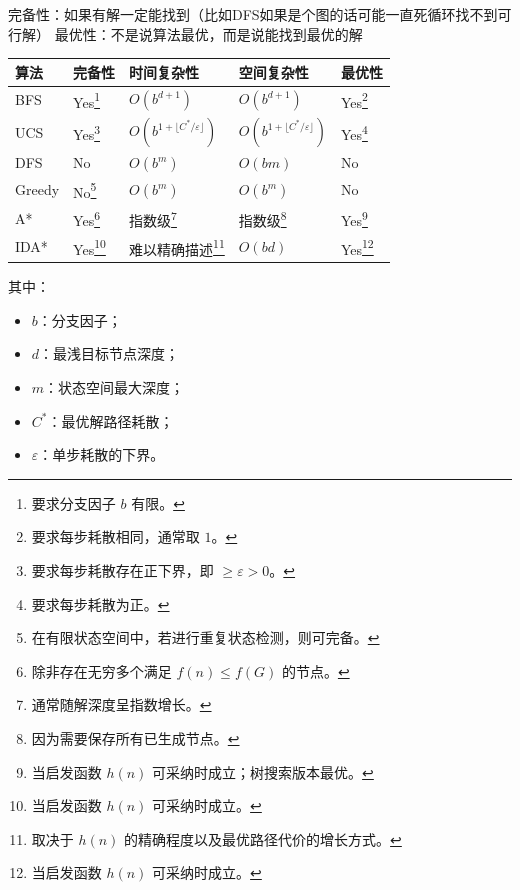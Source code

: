 \documentclass[../main.tex]{subfiles}
\begin{document}
完备性：如果有解一定能找到（比如DFS如果是个图的话可能一直死循环找不到可行解）
最优性：不是说算法最优，而是说能找到最优的解
\begin{center}
\renewcommand{\arraystretch}{1.2}
\begin{tabularx}{\textwidth}{>{\raggedright\arraybackslash}p{2.8cm}
>{\raggedright\arraybackslash}X
>{\raggedright\arraybackslash}X
>{\raggedright\arraybackslash}X
>{\raggedright\arraybackslash}X}
\toprule
算法 & 完备性 & 时间复杂性 & 空间复杂性 & 最优性 \\
\midrule
BFS
& Yes\footnote{要求分支因子 $b$ 有限。}
& $O(b^{d+1})$
& $O(b^{d+1})$
& Yes\footnote{要求每步耗散相同，通常取 $1$。} \\

UCS
& Yes\footnote{要求每步耗散存在正下界，即 $\ge \varepsilon > 0$。}
& $O\!\left(b^{1+\lfloor C^*/\varepsilon \rfloor}\right)$
& $O\!\left(b^{1+\lfloor C^*/\varepsilon \rfloor}\right)$
& Yes\footnote{要求每步耗散为正。} \\

DFS
& No
& $O(b^m)$
& $O(bm)$
& No \\

Greedy
& No\footnote{在有限状态空间中，若进行重复状态检测，则可完备。}
& $O(b^m)$
& $O(b^m)$
& No \\

A*
& Yes\footnote{除非存在无穷多个满足 $f(n)\le f(G)$ 的节点。}
& 指数级\footnote{通常随解深度呈指数增长。}
& 指数级\footnote{因为需要保存所有已生成节点。}
& Yes\footnote{当启发函数 $h(n)$ 可采纳时成立；树搜索版本最优。} \\

IDA*
& Yes\footnote{当启发函数 $h(n)$ 可采纳时成立。}
& 难以精确描述\footnote{取决于 $h(n)$ 的精确程度以及最优路径代价的增长方式。}
& $O(bd)$
& Yes\footnote{当启发函数 $h(n)$ 可采纳时成立。} \\
\bottomrule
\end{tabularx}
\end{center}

其中：
\begin{itemize}
    \item $b$：分支因子；
    \item $d$：最浅目标节点深度；
    \item $m$：状态空间最大深度；
    \item $C^*$：最优解路径耗散；
    \item $\varepsilon$：单步耗散的下界。
\end{itemize}
\end{document}
